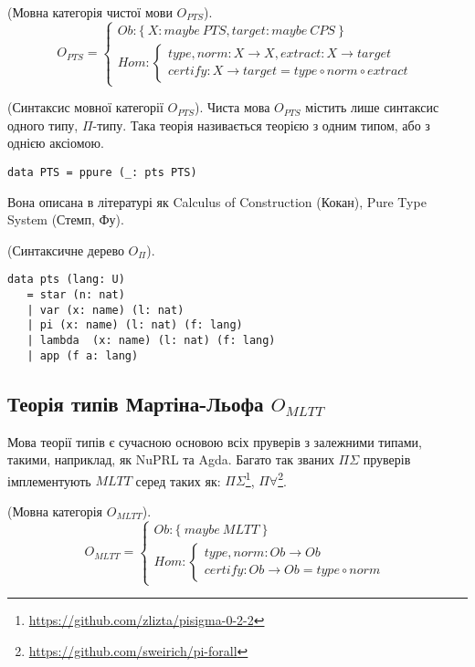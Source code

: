 \begin{definition} (Мовна категорія чистої мови $O_{PTS}$).
\begin{equation}
O_{PTS} =
\begin{cases}
Ob: \{\ X: maybe\ PTS, target: maybe\ CPS \ \} \\
Hom: \begin{cases}
type,norm: X \rightarrow X, extract: X \rightarrow target \\
certify: X \rightarrow target = type \circ norm \circ extract
\end{cases}
\end{cases}
\end{equation}
\end{definition}

\begin{definition} (Синтаксис мовної категорії $O_{PTS}$).
Чиста мова $O_{PTS}$ містить лише синтаксис одного типу, $\Pi$-типу.
Така теорія називається теорією з одним типом, або з однією аксіомою.
\begin{lstlisting}
data PTS = ppure (_: pts PTS)
\end{lstlisting}
\end{definition}

Вона описана в літературі як Calculus of Construction (Кокан),
Pure Type System (Стемп, Фу).

\begin{definition} (Синтаксичне дерево $O_\Pi$).
\begin{lstlisting}[mathescape=true]
data pts (lang: U)
   = star (n: nat)
   | var (x: name) (l: nat)
   | pi (x: name) (l: nat) (f: lang)
   | lambda  (x: name) (l: nat) (f: lang)
   | app (f a: lang)
\end{lstlisting}
\end{definition}

\subsection{Теорія типів Мартіна-Льофа $O_{MLTT}$}

Мова теорії типів є сучасною основою всіх пруверів з залежними типами,
такими, наприклад, як NuPRL та Agda. Багато так званих $\Pi\Sigma$ пруверів
імплементують $MLTT$ серед таких як:
$\Pi\Sigma$\footnote{\url{https://github.com/zlizta/pisigma-0-2-2}},
$\Pi\forall$\footnote{\url{https://github.com/sweirich/pi-forall}}.

\begin{definition} (Мовна категорія $O_{MLTT}$).
\begin{equation}
O_{MLTT} =
\begin{cases}
Ob: \{\ maybe\ MLTT\ \} \\
Hom: \begin{cases}
type,norm: Ob \rightarrow Ob \\
certify: Ob \rightarrow Ob = type \circ norm
\end{cases}
\end{cases}
\end{equation}
\end{definition}

